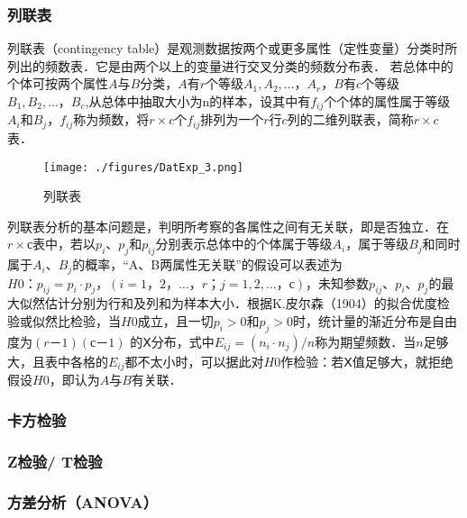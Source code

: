 \subsubsection{列联表}
列联表（contingency table）是观测数据按两个或更多属性（定性变量）分类时所列出的频数表．它是由两个以上的变量进行交叉分类的频数分布表．
若总体中的个体可按两个属性$A$与$B$分类，$A$有$r$个等级$A_1,A_2,…，A_r$，$B$有$c$个等级$B_1,B_2,…，B_c$,从总体中抽取大小为n的样本，设其中有$f_{ij}$个个体的属性属于等级$A_i$和$B_j$，$f_{ij}$称为频数，将$r×c$个$f_{ij}$排列为一个$r$行$c$列的二维列联表，简称$r×c$表．
\begin{figure}[ht]
\centering
\texttt{[image: ./figures/DatExp\_3.png]}
\caption{列联表} \label{DatExp_fig3}
\end{figure}
列联表分析的基本问题是，判明所考察的各属性之间有无关联，即是否独立．在$r×с$表中，若以$p_i$、$p_j$和$p_{ij}$分别表示总体中的个体属于等级$A_i$，属于等级$B_j$和同时属于$A_i$、$B_j$的概率，“A、B两属性无关联”的假设可以表述为$H0：p_{ij}=p_i·p_j，(i=1，2，…，r；j=1,2,…，с)$，未知参数$p_{ij}$、$p_i$、$p_j$的最大似然估计分别为行和及列和为样本大小．根据K.皮尔森（1904）的拟合优度检验或似然比检验，当$H0$成立，且一切$p_i>0$和$p_j>0$时，统计量的渐近分布是自由度为$(r－1)(с－1)$ 的$Ⅹ$分布，式中$E_{ij}=(n_i·n_j)/n$称为期望频数．当$n$足够大，且表中各格的$E_{ij}$都不太小时，可以据此对$H0$作检验：若$Ⅹ$值足够大，就拒绝假设$H0$，即认为$A$与$B$有关联．
\subsubsection{卡方检验}
\subsubsection{Z检验/ T检验}
\subsubsection{方差分析（ANOVA）}
